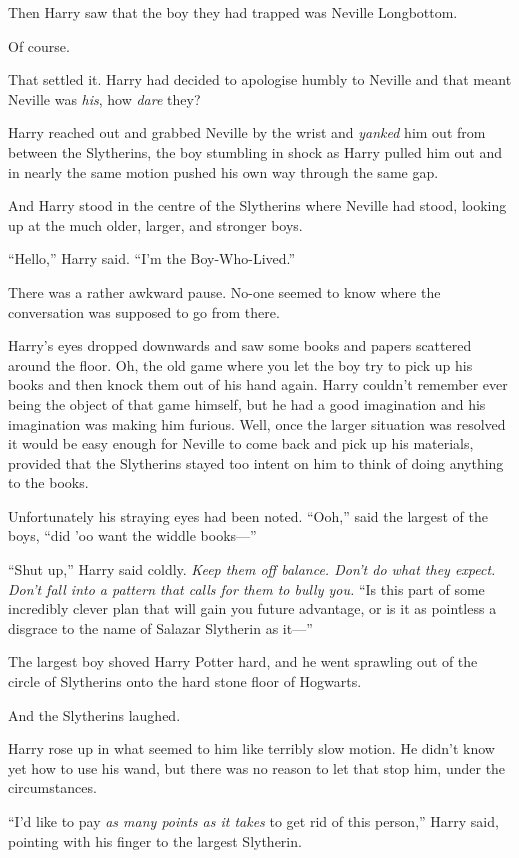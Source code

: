Then Harry saw that the boy they had trapped was Neville Longbottom.

Of course.

That settled it. Harry had decided to apologise humbly to Neville and that meant Neville was \emph{his}, how \emph{dare} they?

Harry reached out and grabbed Neville by the wrist and \emph{yanked} him out from between the Slytherins, the boy stumbling in shock as Harry pulled him out and in nearly the same motion pushed his own way through the same gap.

And Harry stood in the centre of the Slytherins where Neville had stood, looking up at the much older, larger, and stronger boys.

“Hello,” Harry said. “I’m the Boy-Who-Lived.”

There was a rather awkward pause. No-one seemed to know where the conversation was supposed to go from there.

Harry’s eyes dropped downwards and saw some books and papers scattered around the floor. Oh, the old game where you let the boy try to pick up his books and then knock them out of his hand again. Harry couldn’t remember ever being the object of that game himself, but he had a good imagination and his imagination was making him furious. Well, once the larger situation was resolved it would be easy enough for Neville to come back and pick up his materials, provided that the Slytherins stayed too intent on him to think of doing anything to the books.

Unfortunately his straying eyes had been noted. “Ooh,” said the largest of the boys, “did ’oo want the widdle books—”

“Shut up,” Harry said coldly. \emph{Keep them off balance. Don’t do what they expect. Don’t fall into a pattern that calls for them to bully you.} “Is this part of some incredibly clever plan that will gain you future advantage, or is it as pointless a disgrace to the name of Salazar Slytherin as it—”

The largest boy shoved Harry Potter hard, and he went sprawling out of the circle of Slytherins onto the hard stone floor of Hogwarts.

And the Slytherins laughed.

Harry rose up in what seemed to him like terribly slow motion. He didn’t know yet how to use his wand, but there was no reason to let that stop him, under the circumstances.

“I’d like to pay \emph{as many points as it takes} to get rid of this person,” Harry said, pointing with his finger to the largest Slytherin.

